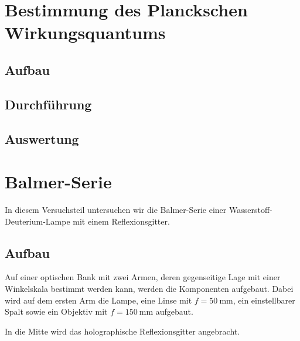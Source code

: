 \FloatBarrier
\section{Bestimmung des Planckschen Wirkungsquantums}

\FloatBarrier
\subsection{Aufbau}

\begin{figure}[htbp]
    \centering
    \caption{%
        \cite[Abbildung~P402.1]{physik412-Anleitung}
    }
    \label{fig:P402.1}
\end{figure}

\FloatBarrier
\subsection{Durchführung}

\FloatBarrier
\subsection{Auswertung}


\FloatBarrier
\section{Balmer-Serie}

In diesem Versuchsteil untersuchen wir die Balmer-Serie einer
Wasserstoff-Deuterium-Lampe mit einem Reflexionsgitter.

\FloatBarrier
\subsection{Aufbau}

Auf einer optischen Bank mit zwei Armen, deren gegenseitige Lage mit einer
Winkelskala bestimmt werden kann, werden die Komponenten aufgebaut. Dabei wird
auf dem ersten Arm die Lampe, eine Linse mit $f = \SI{50}{\milli\meter}$, ein
einstellbarer Spalt sowie ein Objektiv mit $f = \SI{150}{\milli\meter}$
aufgebaut.

In die Mitte wird das holographische Reflexionsgitter angebracht.

